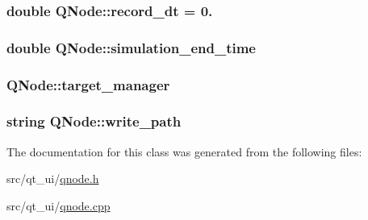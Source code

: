 \subsubsection[{\texorpdfstring{record\+\_\+dt}{record_dt}}]{\setlength{\rightskip}{0pt plus 5cm}double Q\+Node\+::record\+\_\+dt = 0.}\hypertarget{class_q_node_ad1f3252201b932fc5d39b4f80349c7e2}{}\label{class_q_node_ad1f3252201b932fc5d39b4f80349c7e2}
\subsubsection[{\texorpdfstring{simulation\+\_\+end\+\_\+time}{simulation_end_time}}]{\setlength{\rightskip}{0pt plus 5cm}double Q\+Node\+::simulation\+\_\+end\+\_\+time}\hypertarget{class_q_node_a7a127726e48aa5bde733d715af7a744c}{}\label{class_q_node_a7a127726e48aa5bde733d715af7a744c}
\subsubsection[{\texorpdfstring{target\+\_\+manager}{target_manager}}]{ Q\+Node\+::target\+\_\+manager}\hypertarget{class_q_node_adc66765125dfd755d5e7f0c0eb6e6395}{}\label{class_q_node_adc66765125dfd755d5e7f0c0eb6e6395}
\subsubsection[{\texorpdfstring{write\+\_\+path}{write_path}}]{\setlength{\rightskip}{0pt plus 5cm}string Q\+Node\+::write\+\_\+path}\hypertarget{class_q_node_a0967d1922eeb7e39eedca309c7003d23}{}\label{class_q_node_a0967d1922eeb7e39eedca309c7003d23}


The documentation for this class was generated from the following files\+:\begin{DoxyCompactItemize}
\item 
src/qt\+\_\+ui/\hyperlink{qnode_8h}{qnode.\+h}\item 
src/qt\+\_\+ui/\hyperlink{qnode_8cpp}{qnode.\+cpp}\end{DoxyCompactItemize}
